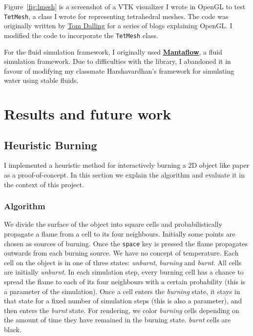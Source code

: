 \documentclass[a4paper]{report}
\begin{document}
Figure~\ref{fig:lmesh} is a screenshot of a VTK visualizer I wrote in OpenGL to test \texttt{TetMesh}, a class I wrote for representing tetrahedral meshes. The code was originally written by \href{http://tomdalling.com/}{Tom Dalling} for a series of blogs explaining OpenGL. I modified the code to incorporate the \texttt{TetMesh} class.

For the fluid simulation framework, I originally used \href{http://mantaflow.com/}{\textbf{Mantaflow}}, a fluid simulation framework. Due to difficulties with the library, I abandoned it in favour of modifying my classmate Harshavardhan's framework for simulating water using stable fluids.

\chapter{Results and future work}

\section{Heuristic Burning}

I implemented a heuristic method for interactively burning a 2D object like paper as a proof-of-concept. In this section we explain the algorithm and evaluate it in the context of this project.

\subsection{Algorithm}

We divide the surface of the object into square cells and probabilistically propagate a flame from a cell to its four neighbours. Initially some points are chosen as sources of burning. Once the \texttt{space} key is pressed the flame  propagates outwards from each burning source. We have no concept of temperature. Each cell on the object is in one of three states: \textit{unburnt}, \textit{burning} and \textit{burnt}. All cells are initially \textit{unburnt}. In each simulation step, every burning cell has a chance to spread the flame to each of its four neighbours with a certain probability (this is a parameter of the simulation). Once a cell enters the \textit{burning} state, it stays in that state for a fixed number of simulation steps (this is also a parameter), and then enters the \textit{burnt} state. For rendering, we color \textit{burning} cells depending on the amount of time they have remained in the burning state. \textit{burnt} cells are black.
\end{document}
